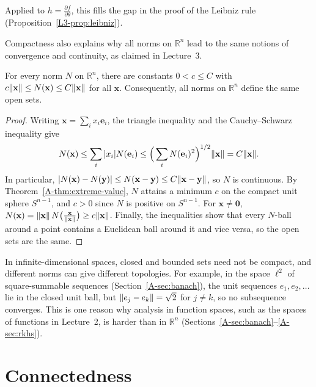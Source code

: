Applied to $h = \frac{\partial f}{\partial\theta}$, this fills the gap in the proof of the Leibniz rule (Proposition~\ref{L3-prop:leibniz}).

Compactness also explains why all norms on $\mathbb{R}^n$ lead to the same notions of convergence and continuity, as claimed in Lecture~3.

\begin{theorem}\label{A-thm:norms-equivalent}
    For every norm $N$ on $\mathbb{R}^n$, there are constants $0 < c \leq C$ with $c\lVert \mathbf{x} \rVert \leq N(\mathbf{x}) \leq C\lVert \mathbf{x} \rVert$ for all $\mathbf{x}$. Consequently, all norms on $\mathbb{R}^n$ define the same open sets.
\end{theorem}

\begin{proof}
    Writing $\mathbf{x} = \sum_i x_i\mathbf{e}_i$, the triangle inequality and the Cauchy--Schwarz inequality give
    \[N(\mathbf{x}) \leq \sum_i |x_i| N(\mathbf{e}_i) \leq \Big(\sum_i N(\mathbf{e}_i)^2\Big)^{1/2}\lVert \mathbf{x} \rVert = C\lVert \mathbf{x} \rVert.\]
    In particular, $|N(\mathbf{x}) - N(\mathbf{y})| \leq N(\mathbf{x} - \mathbf{y}) \leq C\lVert \mathbf{x} - \mathbf{y} \rVert$, so $N$ is continuous. By Theorem~\ref{A-thm:extreme-value}, $N$ attains a minimum $c$ on the compact unit sphere $S^{n-1}$, and $c > 0$ since $N$ is positive on $S^{n-1}$. For $\mathbf{x} \neq \mathbf{0}$, $N(\mathbf{x}) = \lVert \mathbf{x} \rVert\, N\big(\frac{\mathbf{x}}{\lVert \mathbf{x} \rVert}\big) \geq c\lVert \mathbf{x} \rVert$. Finally, the inequalities show that every $N$-ball around a point contains a Euclidean ball around it and vice versa, so the open sets are the same.
\end{proof}

\begin{remark}\label{A-rem:infinite-dimensions}
    In infinite-dimensional spaces, closed and bounded sets need not be compact, and different norms can give different topologies. For example, in the space $\ell^2$ of square-summable sequences (Section~\ref{A-sec:banach}), the unit sequences $e_1, e_2, \ldots$ lie in the closed unit ball, but $\lVert e_j - e_k \rVert = \sqrt{2}$ for $j \neq k$, so no subsequence converges. This is one reason why analysis in function spaces, such as the spaces of functions in Lecture~2, is harder than in $\mathbb{R}^n$ (Sections~\ref{A-sec:banach}--\ref{A-sec:rkhs}).
\end{remark}

\section{Connectedness}\label{A-sec:connected}

